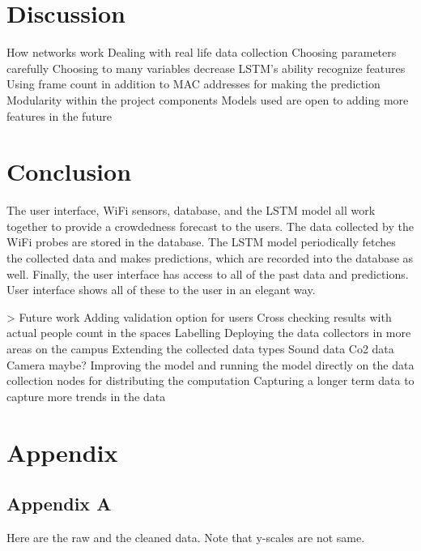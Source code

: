 \documentclass[journal, 12pt]{IEEEtran}
\begin{document}
\section{Discussion} 





How networks work
Dealing with real life data collection
Choosing parameters carefully
Choosing to many variables decrease LSTM’s ability recognize features
Using frame count in addition to MAC addresses for making the prediction
Modularity within the project components
Models used are open to adding more features in the future



\section{Conclusion} 

\noindent The user interface, WiFi sensors, database, and the LSTM model all work together to provide a crowdedness forecast to the users. The data collected by the WiFi probes are stored in the database. The LSTM model periodically fetches the collected data and makes predictions, which are recorded into the database as well. Finally, the user interface has access to all of the past data and predictions. User interface shows all of these to the user in an elegant way.


> Future work
Adding validation option for users 
Cross checking results with actual people count in the spaces
Labelling
Deploying the data collectors in more areas on the campus
Extending the collected data types
Sound data
Co2 data
Camera maybe?
Improving the model and running the model directly on the data collection nodes for distributing the computation
Capturing a longer term data to capture more trends in the data



\printbibliography

\onecolumn 

\section{Appendix}

\subsection{Appendix A}
Here are the raw and the cleaned data. Note that y-scales are not same.
\end{document}
